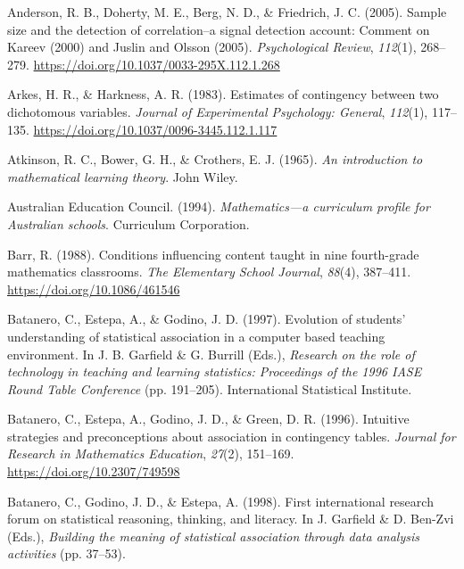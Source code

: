 \documentclass[11pt]{umnthesis}
\newlength{\cslhangindent}
\newenvironment{CSLReferences}[2] %
 {%
  \setlength{\parindent}{0pt}
  \ifodd #1 \everypar{\setlength{\hangindent}{\cslhangindent}}\ignorespaces\fi
  \ifnum #2 > 0
  \setlength{\parskip}{#2\baselineskip}
  \fi
 }%
 {}
\begin{document}
\begin{CSLReferences}{1}{0}
\leavevmode{}%
Anderson, R. B., Doherty, M. E., Berg, N. D., \& Friedrich, J. C. (2005). Sample size and the detection of correlation--a signal detection account: Comment on {K}areev (2000) and {J}uslin and {O}lsson (2005). \emph{Psychological Review}, \emph{112}(1), 268--279. \url{https://doi.org/10.1037/0033-295X.112.1.268}

\leavevmode{}%
Arkes, H. R., \& Harkness, A. R. (1983). Estimates of contingency between two dichotomous variables. \emph{Journal of Experimental Psychology: General}, \emph{112}(1), 117--135. \url{https://doi.org/10.1037/0096-3445.112.1.117}

\leavevmode{}%
Atkinson, R. C., Bower, G. H., \& Crothers, E. J. (1965). \emph{An introduction to mathematical learning theory}. John Wiley.

\leavevmode{}%
Australian Education Council. (1994). \emph{Mathematics---a curriculum profile for {A}ustralian schools}. Curriculum Corporation.

\leavevmode{}%
Barr, R. (1988). Conditions influencing content taught in nine fourth-grade mathematics classrooms. \emph{The Elementary School Journal}, \emph{88}(4), 387--411. \url{https://doi.org/10.1086/461546}

\leavevmode{}%
Batanero, C., Estepa, A., \& Godino, J. D. (1997). Evolution of students' understanding of statistical association in a computer based teaching environment. In J. B. Garfield \& G. Burrill (Eds.), \emph{Research on the role of technology in teaching and learning statistics: Proceedings of the 1996 {IASE Round Table Conference}} (pp. 191--205). International Statistical Institute.

\leavevmode{}%
Batanero, C., Estepa, A., Godino, J. D., \& Green, D. R. (1996). Intuitive strategies and preconceptions about association in contingency tables. \emph{Journal for Research in Mathematics Education}, \emph{27}(2), 151--169. \url{https://doi.org/10.2307/749598}

\leavevmode{}%
Batanero, C., Godino, J. D., \& Estepa, A. (1998). First international research forum on statistical reasoning, thinking, and literacy. In J. Garfield \& D. Ben-Zvi (Eds.), \emph{Building the meaning of statistical association through data analysis activities} (pp. 37--53).


\end{CSLReferences}
\end{document}

